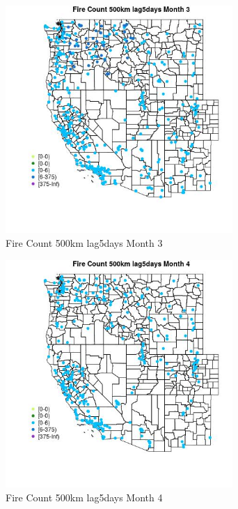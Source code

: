 \begin{figure} 
\centering  
\includegraphics[width=0.77\textwidth]{Code_Outputs/Report_ML_input_PM25_Step4_part_e_de_duplicated_aves_compiled_2019-05-18wNAs_MapObsMo3Fire_Count_500km_lag5days.jpg} 
\caption{\label{fig:Report_ML_input_PM25_Step4_part_e_de_duplicated_aves_compiled_2019-05-18wNAsMapObsMo3Fire_Count_500km_lag5days}Fire Count 500km lag5days Month 3} 
\end{figure} 
 

\begin{figure} 
\centering  
\includegraphics[width=0.77\textwidth]{Code_Outputs/Report_ML_input_PM25_Step4_part_e_de_duplicated_aves_compiled_2019-05-18wNAs_MapObsMo4Fire_Count_500km_lag5days.jpg} 
\caption{\label{fig:Report_ML_input_PM25_Step4_part_e_de_duplicated_aves_compiled_2019-05-18wNAsMapObsMo4Fire_Count_500km_lag5days}Fire Count 500km lag5days Month 4} 
\end{figure} 
 


